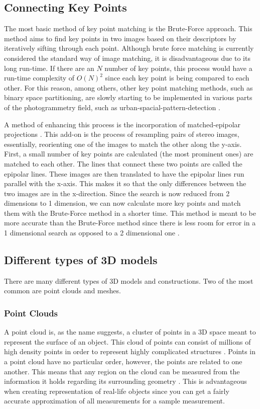 \documentclass[10pt,twocolumn]{article}
\begin{document}
\subsection{Connecting Key Points}
The most basic method of key point matching is the Brute-Force approach. This method aims to find key points in two images based on their descriptors by iteratively sifting through each point. Although brute force matching is currently considered the standard way of image matching, it is disadvantageous due to its long run-time. If there are an \begin{math}N\end{math} number of key points, this process would have a run-time complexity of \begin{math}O(N)^2\end{math} since each key point is being compared to each other. For this reason, among others, other key point matching methods, such as binary space partitioning, are slowly starting to be implemented in various parts of the photogrammetry field, such as urban-spacial-pattern-detection \cite{morgan2009using}.

A method of enhancing this process is the incorporation of matched-epipolar projections \cite{papadimitriou1996epipolar}. This add-on is the process of resampling pairs of stereo images, essentially, reorienting one of the images to match the other along the y-axis. First, a small number of key points are calculated (the most prominent ones) are matched to each other. The lines that connect these two points are called the epipolar lines. These images are then translated to have the epipolar lines run parallel with the x-axis. This makes it so that the only differences between the two images are in the x-direction. Since the search is now reduced from 2 dimensions to 1 dimension, we can now calculate more key points and match them with the Brute-Force method in a shorter time. This method is meant to be more accurate than the Brute-Force method since there is less room for error in a 1 dimensional search as opposed to a 2 dimensional one \cite{papadimitriou1996epipolar}.


\subsection{Different types of 3D models}
There are many different types of 3D models and constructions. Two of the most common are point clouds and meshes. 
\subsubsection{Point Clouds}
A point cloud is, as the name suggests, a cluster of points in a 3D space meant to represent the surface of an object. This cloud of points can consist of millions of high density points in order to represent highly complicated structures \cite{leberl2010point}. Points in a point cloud have no particular order, however, the points are related to one another. This means that any region on the cloud can be measured from the information it holds regarding its surrounding geometry \cite{leberl2010point}. This is advantageous when creating representation of real-life objects since you can get a fairly accurate approximation of all measurements for a sample measurement. 
\end{document}
